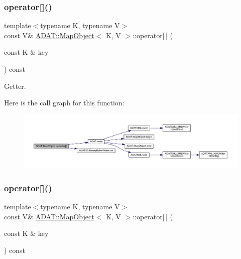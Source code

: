 \subsubsection{\texorpdfstring{operator[]()}{operator[]()}\hspace{0.1cm}{\footnotesize\ttfamily [1/6]}}
{\footnotesize\ttfamily template$<$typename K, typename V$>$ \\
const V\& \mbox{\hyperlink{classADAT_1_1MapObject}{A\+D\+A\+T\+::\+Map\+Object}}$<$ K, V $>$\+::operator\mbox{[}$\,$\mbox{]} (\begin{DoxyParamCaption}\item[{const K \&}]{key }\end{DoxyParamCaption}) const\hspace{0.3cm}{\ttfamily [inline]}}



Getter. 

Here is the call graph for this function\+:
\nopagebreak
\begin{figure}[H]
\begin{center}
\leavevmode
\includegraphics[width=350pt]{da/d29/classADAT_1_1MapObject_adb014dc7d3ef80a73fd1734e818eeef4_cgraph}
\end{center}
\end{figure}
\mbox{\label{classADAT_1_1MapObject_adb014dc7d3ef80a73fd1734e818eeef4}} 
\subsubsection{\texorpdfstring{operator[]()}{operator[]()}\hspace{0.1cm}{\footnotesize\ttfamily [2/6]}}
{\footnotesize\ttfamily template$<$typename K, typename V$>$ \\
const V\& \mbox{\hyperlink{classADAT_1_1MapObject}{A\+D\+A\+T\+::\+Map\+Object}}$<$ K, V $>$\+::operator\mbox{[}$\,$\mbox{]} (\begin{DoxyParamCaption}\item[{const K \&}]{key }\end{DoxyParamCaption}) const\hspace{0.3cm}{\ttfamily [inline]}}



